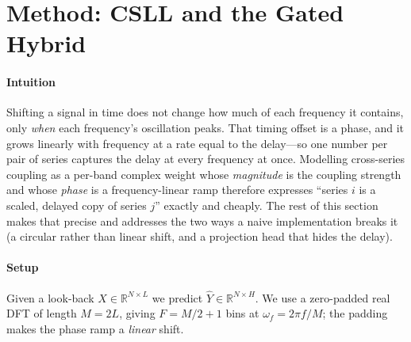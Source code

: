 \documentclass[journal,a4paper]{IEEEtran}
\begin{document}
\section{Method: CSLL and the Gated Hybrid}
\label{sec:method}
\paragraph{Intuition} Shifting a signal in time does not change how much of each frequency it
contains, only \emph{when} each frequency's oscillation peaks. That timing offset is a phase, and
it grows linearly with frequency at a rate equal to the delay---so one number per pair of series
captures the delay at every frequency at once. Modelling cross-series coupling as a per-band
complex weight whose \emph{magnitude} is the coupling strength and whose \emph{phase} is a
frequency-linear ramp therefore expresses ``series $i$ is a scaled, delayed copy of series $j$''
exactly and cheaply. The rest of this section makes that precise and addresses the two ways a naive
implementation breaks it (a circular rather than linear shift, and a projection head that hides the
delay).

\paragraph{Setup} Given a look-back $X\in\mathbb{R}^{N\times L}$ we predict
$\hat{Y}\in\mathbb{R}^{N\times H}$. We use a zero-padded real DFT of length $M=2L$, giving
$F=M/2+1$ bins at $\omega_f=2\pi f/M$; the padding makes the phase ramp a \emph{linear} shift.
\end{document}
